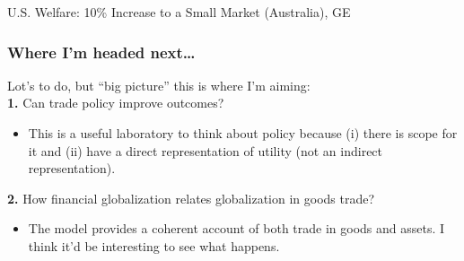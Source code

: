 \documentclass[9pt,pdftex,aspectratio=1610]{beamer}
\theoremstyle{definition}
\begin{document}

\begin{frame}[t]{U.S. Welfare: 10\% {\color{red} Increase} to a Small Market (Australia), {\color{red} GE} }
\vspace{-.5cm}
\begin{figure}[!t]
\end{figure}
\end{frame}



\begin{frame}[t]
\frametitle{Where I'm headed next\ldots}
\smallskip
Lot's to do, but ``big picture'' this is where I'm aiming:\\
\bigskip
\textbf{1.} Can trade policy improve outcomes?
\begin{itemize}
\smallskip
\item This is a useful laboratory to think about policy because (i) there is scope for it and (ii) have a direct representation of utility (not an indirect representation).
\end{itemize}
\bigskip
\textbf{2.} How financial globalization relates globalization in goods trade?
\begin{itemize}
\smallskip
\item The model provides a coherent account of both trade in goods and assets. I think it'd be interesting to see what happens.
\end{itemize}
\end{frame}
\end{document}
